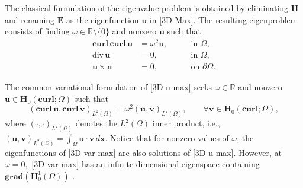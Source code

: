 The classical formulation of the eigenvalue problem is obtained by eliminating $\mathbf{H}$ and renaming $\mathbf{E}$ as the eigenfunction $\mathbf{u}$ in \eqref{3D Max}. The resulting eigenproblem consists of finding $\omega \in \mathbb{R}\setminus\{0\}$ and nonzero  $\mathbf{u}$ such that
\begin{subequations}\label{3D u max}
\begin{align}
    \textbf{curl} \, \textbf{curl} \,  \mathbf{u} &= \omega^2 \mathbf{u}, \qquad &\text{in } \Omega,\\
    \text{div} \, \mathbf{u} &= 0, \qquad &\text{in }  \Omega, \\
    \mathbf{u} \times \mathbf{n} &= 0, \qquad &\text{on } \partial \Omega. 
\end{align}
\end{subequations}

The common variational formulation of \eqref{3D u max} seeks $\omega \in \mathbb{R}$ and nonzero $\mathbf{u} \in \mathbf{H}_0(\textbf{curl}; \Omega)$ such that
\begin{equation} \label{3D var max}
    (\textbf{curl} \, \mathbf{u}, \textbf{curl} \, \mathbf{v})_{L^2(\Omega)} = \omega^2(\mathbf{u}, \mathbf{v})_{L^2(\Omega)}, \qquad \forall \mathbf{v} \in \mathbf{H}_0(\textbf{curl}; \Omega),
\end{equation}
where $(\cdot, \cdot)_{L^2(\Omega)}$ denotes the $L^2(\Omega)$ inner product, i.e., $(\mathbf{u}, \mathbf{v})_{L^2(\Omega)} = \int_{\Omega} \mathbf{u} \cdot \overline{\mathbf{v}} \, d \mathbf{x}.$
Notice that for nonzero values of $\omega$, the eigenfunctions of \eqref{3D var max} are also solutions of \eqref{3D u max}. However,  at $\omega = 0,$ \eqref{3D var max} has an infinite-dimensional eigenspace containing $\textbf{grad}(\mathbf{H}_0^1(\Omega))$ \cite{Boffi}. 



